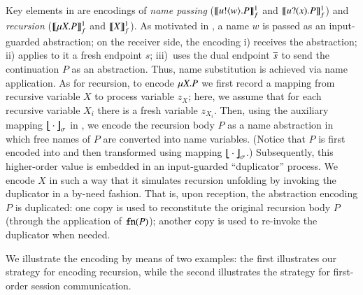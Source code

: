 \documentclass[preprint,11pt]{elsarticle}
\begin{document}
{{{Key elements in 
 are encodings of 
{\em name passing} ($\llbracket u ! \langle w \rangle . P\rrbracket^1_f$ and $\llbracket u ? (x) . P\rrbracket^1_f$)  and  
{\em recursion} ($\llbracket\mu X. P\rrbracket^1_f$ and $\llbracket X\rrbracket^1_f$).
As motivated in , %
a name $w$ is passed as an input-guarded abstraction;
on the receiver side,
the encoding %
i) receives
the abstraction; ii) applies to it a fresh  endpoint $s$;
iii)~uses the dual endpoint $\overline{s}$ to send the continuation $P$ as an abstraction.
Thus, name substitution is achieved via name application.
As for recursion, to encode $\mu X. P$ we
first record a mapping from recursive variable $X$ to process variable $z_X$; here, we assume that for each recursive variable $X_i$ there is a fresh variable $z_{X_i}$.
Then, using the auxiliary mapping
$\big\lfloor\!\!\big\lfloor\cdot\big\rfloor\!\!\big\rfloor^{}_\sigma$ in 
, we encode the recursion body $P$ as a name abstraction
in which free names of $P$ are converted into name variables.
(Notice that $P$ is first encoded into \HO and then transformed using mapping
$\big\lfloor\!\!\big\lfloor\cdot\big\rfloor\!\!\big\rfloor^{}_\sigma$.)
Subsequently, this higher-order value is embedded in an input-guarded 
``duplicator'' process. We encode $X$ 
in such a way that it
simulates recursion unfolding by 
invoking the duplicator in a by-need fashion.
That is, upon reception, the \HO abstraction encoding  
$P$
is duplicated: 
one copy is used to reconstitute the original recursion body $P$ (through
the application of $\mathtt{fn}(P)$); another copy is used to re-invoke
the duplicator when needed. %

We illustrate the encoding by means of two examples: the first illustrates our strategy for encoding recursion, while the second illustrates the strategy for first-order session communication.}


 

}}
\end{document}
